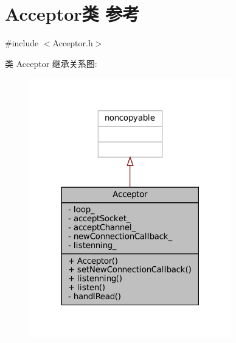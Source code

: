 \hypertarget{classmuduo_1_1Acceptor}{}\section{Acceptor类 参考}
\label{classmuduo_1_1Acceptor}


{\ttfamily \#include $<$Acceptor.\+h$>$}



类 Acceptor 继承关系图\+:
\nopagebreak
\begin{figure}[H]
\begin{center}
\leavevmode
\includegraphics[width=249pt]{classmuduo_1_1Acceptor__inherit__graph}
\end{center}
\end{figure}


